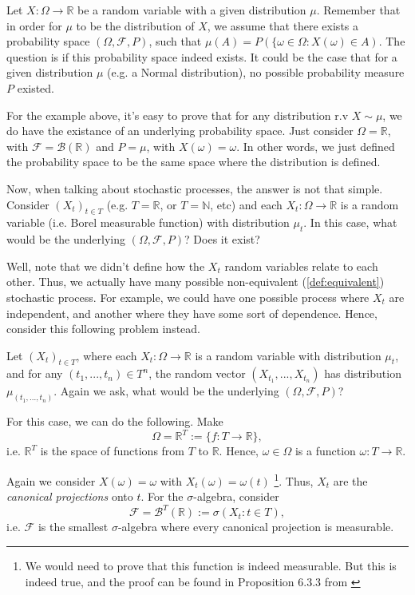 Let $X:\Omega \to \mathbb R$ be a random variable with a given distribution $\mu$.
Remember that in order for $\mu$ to be the distribution of $X$, we assume
that there exists a probability space $(\Omega, \mathcal  F, P)$, such
that $\mu(A) = P(\{\omega \in \Omega : X(\omega) \in A)$. The question is
if this probability space indeed exists. It could be the case that for a given
distribution $\mu$ (e.g. a Normal distribution), no possible probability
measure $P$ existed.

For the example above, it's easy to prove that for any distribution r.v $X \sim \mu$,
we do have the existance of an underlying probability space. Just consider
$\Omega = \mathbb R$, with $\mathcal F = \mathcal B(\mathbb R)$ and $P = \mu$, with
$X(\omega)= \omega$. In other words, we just defined the probability space
to be the same space where the distribution is defined.

Now, when talking about stochastic processes, the answer is not that simple.
Consider $(X_t)_{t \in T}$ (e.g. $T = \mathbb R$, or $T = \mathbb N$, etc) and
each $X_t :\Omega \to \mathbb R$ is a random variable (i.e. Borel measurable function) with
distribution $\mu_t$.
In this case, what would be the underlying $(\Omega, \mathcal F, P)$? Does it exist?

Well, note that we didn't define how the $X_t$ random variables relate to each other. Thus,
we actually have many possible non-equivalent (\ref{def:equivalent}) stochastic process.
For example, we could have one possible process where $X_t$ are independent, and another
where they have some sort of dependence. Hence, consider this following problem instead.

Let $(X_t)_{t \in T}$, where each $X_t :\Omega \to \mathbb R$ is a random variable with
distribution $\mu_t$, and for any $(t_1,...,t_n) \in T^n$, the random vector
$(X_{t_1},...,X_{t_n})$ has distribution $\mu_{(t_1,...,t_n)}$.
Again we ask, what would be the underlying $(\Omega, \mathcal F, P)$?

For this case, we can do the following. Make
\begin{displaymath}
	\Omega = \mathbb R^T := \{f:T \to \mathbb R\},
\end{displaymath}
i.e. $\mathbb R^T$ is the space of functions from $T$ to $\mathbb R$.
Hence, $\omega \in \Omega$ is a function $\omega:T \to \mathbb R$.

Again we consider $X(\omega) = \omega$ with $X_t(\omega)=\omega(t)$
\footnote{We would need to prove that this function is indeed measurable. But this is indeed true,
	and the proof can be found in Proposition 6.3.3 from \citet{athreya2006measure}}.
Thus, $X_t$ are the \textit{canonical projections} onto $t$.
For the $\sigma$-algebra, consider
\begin{displaymath}
	\mathcal F = \mathcal B^T(\mathbb R) := \sigma \left(X_t : t \in T\right),
\end{displaymath}
i.e. $\mathcal F$ is the smallest $\sigma$-algebra where every canonical projection
is measurable.

